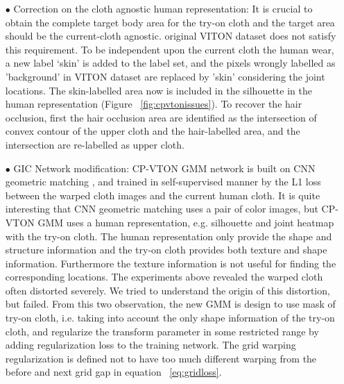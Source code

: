\begin{itemize}

\item[$\bullet$]  Correction on the cloth agnostic human representation:
It is crucial to obtain the complete target body area for the try-on cloth and the target area should be the current-cloth agnostic. original VITON dataset does not satisfy this requirement.  
To be independent upon the current cloth the human wear, a new label ‘skin’ is added to the label set,  and the pixels wrongly labelled as 'background' in VITON dataset are replaced by 'skin' considering the joint locations. The skin-labelled area now is included in the silhouette in the human representation (Figure  ~\ref{fig:cpvtonissues}).
To recover the hair occlusion, first the hair occlusion area are identified as the intersection of convex contour of the upper cloth and the hair-labelled area, and the intersection are re-labelled as upper cloth.   


\item[$\bullet$] GIC Network modification: 
CP-VTON GMM network is built on CNN geometric matching \cite{rocco2017convolutional}, and trained in self-supervised manner by the L1 loss between the warped cloth images and the current human cloth. It is quite interesting that CNN geometric matching uses a pair of color images, but CP-VTON GMM uses a human representation, e.g. silhouette and joint heatmap with the try-on cloth.  The human representation only provide the shape and structure information and the try-on cloth provides both texture and shape information. Furthermore the texture information is not useful for finding the corresponding locations. The experiments above revealed the warped cloth often distorted severely. We tried to understand the origin of this distortion, but failed. From this two observation, the new GMM is design to use mask of try-on cloth, i.e. taking into account the only shape information of the try-on cloth, and regularize the transform parameter in some restricted range by adding regularization loss to the training network. The grid warping regularization is defined not to have too much different warping from the before and next grid gap in equation ~\ref{eq:gridloss}.

 



\end{itemize}
